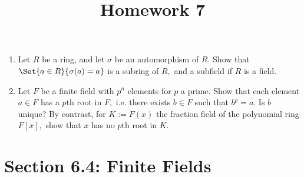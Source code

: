 \documentclass{article}
\begin{document}
\title{Homework 7}
\maketitle
\thispagestyle{fancy}

\begin{enumerate}
	\item Let $R$ be a ring, and let $\sigma$ be an automorphism of $R.$ Show that $\Set{a\in R}{\sigma(a)=a}$ is a subring of $R,$ and a subfield if $R$ is a field.

	\item Let $F$ be a finite field with $p^n$ elements for $p$ a prime. Show that each element $a\in F$ has a $p$th root in $F,$ i.e. there exists $b\in F$ such that $b^p=a.$ Is $b$ unique? By contrast, for $K:=F(x)$ the fraction field of the polynomial ring $F[x],$ show that $x$ has no $p$th root in $K.$
		
\end{enumerate}

\section*{Section 6.4: Finite Fields}
\end{document}
